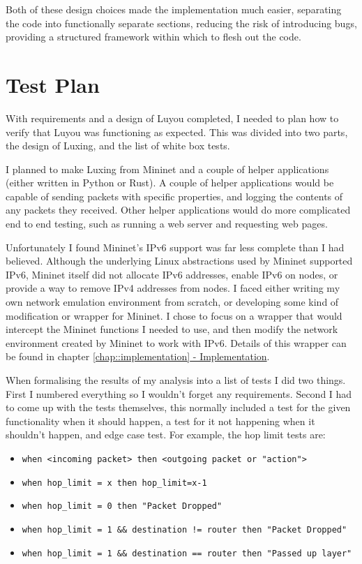 \documentclass[12pt,a4paper,twoside,openany]{report}
\begin{document}
\bigskip

Both of these design choices made the implementation much easier, separating the code into functionally separate sections, reducing the risk of introducing bugs, providing a structured framework within which to flesh out the code.

\section{Test Plan}
\label{sec::test_plan}

With requirements and a design of Luyou completed, I needed to plan how to verify that Luyou was functioning as expected.  This was divided into two parts, the design of Luxing, and the list of white box tests.

\bigskip

I planned to make Luxing from Mininet and a couple of helper applications (either written in Python or Rust).  A couple of helper applications would be capable of sending packets with specific properties, and logging the contents of any packets they received. Other helper applications would do more complicated end to end testing, such as running a web server and requesting web pages.  

Unfortunately I found Mininet's IPv6 support was far less complete than I had believed. Although the underlying Linux abstractions used by Mininet supported IPv6, Mininet itself did not allocate IPv6 addresses, enable IPv6 on nodes, or provide a way to remove IPv4 addresses from nodes.  I faced either writing my own network emulation environment from scratch, or developing some kind of modification or wrapper for Mininet.  I chose to focus on a wrapper that would intercept the Mininet functions I needed to use, and then modify the network environment created by Mininet to work with IPv6. Details of this wrapper can be found in chapter \ref{chap::implementation}\hyperref[chap::implementation]{ - Implementation}.

\bigskip

When formalising the results of my analysis into a list of tests I did two things. First I  numbered everything so I wouldn't forget any requirements.  Second I had to come up with the tests themselves, this normally included a test for the given functionality when it should happen, a test for it not happening when it shouldn't happen, and edge case test.  For example, the hop limit tests are:
\begin{itemize}
\item \verb!when <incoming packet> then <outgoing packet or "action">!
\item \verb!when hop_limit = x then hop_limit=x-1!
\item \verb!when hop_limit = 0 then "Packet Dropped"!
\item \verb+when hop_limit = 1 && destination != router then "Packet Dropped" +
\item \verb!when hop_limit = 1 && destination == router then "Passed up layer"!
\end{itemize}
\end{document}

